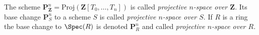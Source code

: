 \begin{definition}
\label{definition-projective-space}
The scheme
$\mathbf{P}^n_{\mathbf{Z}} = \text{Proj}(\mathbf{Z}[T_0, \ldots, T_n])$
is called {\it projective $n$-space over $\mathbf{Z}$}.
Its base change $\mathbf{P}^n_S$ to a scheme $S$ is called
{\it projective $n$-space over $S$}. If $R$ is a ring the base change
to $\Spec(R)$ is denoted $\mathbf{P}^n_R$ and called
{\it projective $n$-space over $R$}.
\end{definition}